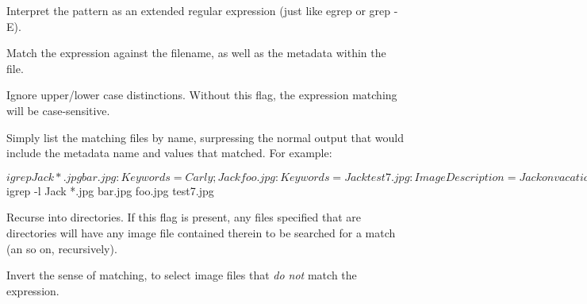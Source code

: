 Interpret the pattern as an extended regular expression (just like
{\cf egrep} or {\cf grep -E}).
\apiend

Match the expression against the filename, as well as the metadata
within the file.
\apiend

Ignore upper/lower case distinctions.  Without this flag, the expression
matching will be case-sensitive.
\apiend

Simply list the matching files by name, surpressing the normal output
that would include the metadata name and values that matched.
For example:

\begin{code}
    $ igrep Jack *.jpg 
    bar.jpg: Keywords = Carly; Jack
    foo.jpg: Keywords = Jack
    test7.jpg: ImageDescription = Jack on vacation

    $ igrep -l Jack *.jpg
    bar.jpg
    foo.jpg
    test7.jpg
\end{code}

\apiend

Recurse into directories.  If this flag is present, any files specified
that are directories will have any image file contained therein to be
searched for a match (an so on, recursively).
\apiend

Invert the sense of matching, to select image files that \emph{do not}
match the expression.
\apiend

